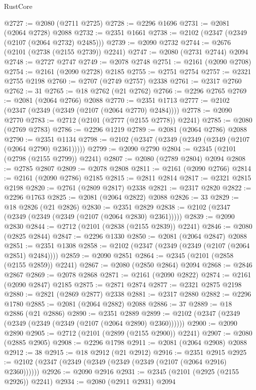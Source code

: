 \begin{lexlean}{RustCore}
\begin{coremodule}
@2727 := @2080 (@2711 @2725)
@2728 := @2296 @1696
@2731 := @2081 (@2064 @2728) @2088
@2732 := @2351 @1661
@2738 := @2102 (@2347 (@2349 (@2107 (@2064 @2732) @2485)))
@2739 := @2090 @2732
@2744 := @2676 (@2101 (@2738 (@2155 @2739)) @2241)
@2747 := @2080 (@2731 @2744) @2094
@2748 := @2727 @2747
@2749 := @2078 @2748
@2751 := @2161 (@2090 @2708)
@2754 := @2161 (@2090 @2728) @2185
@2755 := @2751 @2754
@2757 := @2321 @2755 @2198
@2760 := @2707 (@2749 @2757) @2338
@2761 := @2317 @2760
@2762 := 31
@2765 := @18 @2762 (@21 @2762)
@2766 := @2296 @2765
@2769 := @2081 (@2064 @2766) @2088
@2770 := @2351 @1713
@2777 := @2102 (@2347 (@2349 (@2349 (@2107 (@2064 @2770) @2484))))
@2778 := @2090 @2770
@2783 := @2712 (@2101 (@2777 (@2155 @2778)) @2241)
@2785 := @2080 (@2769 @2783)
@2786 := @2296 @1219
@2789 := @2081 (@2064 @2786) @2088
@2790 := @2351 @1134
@2798 := @2102 (@2347 (@2349 (@2349 (@2349 (@2107 (@2064 @2790) @2361)))))
@2799 := @2090 @2790
@2804 := @2345 (@2101 (@2798 (@2155 @2799)) @2241)
@2807 := @2080 (@2789 @2804) @2094
@2808 := @2785 @2807
@2809 := @2078 @2808
@2811 := @2161 (@2090 @2766)
@2814 := @2161 (@2090 @2786) @2185
@2815 := @2811 @2814
@2817 := @2321 @2815 @2198
@2820 := @2761 (@2809 @2817) @2338
@2821 := @2317 @2820
@2822 := @2296 @1763
@2825 := @2081 (@2064 @2822) @2088
@2826 := 33
@2829 := @18 @2826 (@21 @2826)
@2830 := @2351 @2829
@2838 := @2102 (@2347 (@2349 (@2349 (@2349 (@2107 (@2064 @2830) @2361)))))
@2839 := @2090 @2830
@2844 := @2712 (@2101 (@2838 (@2155 @2839)) @2241)
@2846 := @2080 (@2825 @2844)
@2847 := @2296 @1330
@2850 := @2081 (@2064 @2847) @2088
@2851 := @2351 @1308
@2858 := @2102 (@2347 (@2349 (@2349 (@2107 (@2064 @2851) @2484))))
@2859 := @2090 @2851
@2864 := @2345 (@2101 (@2858 (@2155 @2859)) @2241)
@2867 := @2080 (@2850 @2864) @2094
@2868 := @2846 @2867
@2869 := @2078 @2868
@2871 := @2161 (@2090 @2822)
@2874 := @2161 (@2090 @2847) @2185
@2875 := @2871 @2874
@2877 := @2321 @2875 @2198
@2880 := @2821 (@2869 @2877) @2338
@2881 := @2317 @2880
@2882 := @2296 @1780
@2885 := @2081 (@2064 @2882) @2088
@2886 := 37
@2889 := @18 @2886 (@21 @2886)
@2890 := @2351 @2889
@2899 := @2102 (@2347 (@2349 (@2349 (@2349 (@2349 (@2107 (@2064 @2890) @2360))))))
@2900 := @2090 @2890
@2905 := @2712 (@2101 (@2899 (@2155 @2900)) @2241)
@2907 := @2080 (@2885 @2905)
@2908 := @2296 @1798
@2911 := @2081 (@2064 @2908) @2088
@2912 := 38
@2915 := @18 @2912 (@21 @2912)
@2916 := @2351 @2915
@2925 := @2102 (@2347 (@2349 (@2349 (@2349 (@2349 (@2107 (@2064 @2916) @2360))))))
@2926 := @2090 @2916
@2931 := @2345 (@2101 (@2925 (@2155 @2926)) @2241)
@2934 := @2080 (@2911 @2931) @2094

\end{coremodule}
\end{lexlean}
